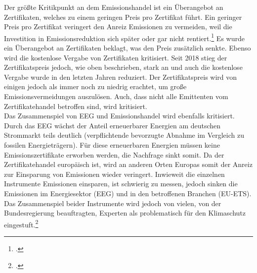 Der größte Kritikpunkt an dem Emissionshandel ist ein Überangebot an Zertifikaten, welches zu einem geringen Preis pro Zertifikat führt.
Ein geringer Preis pro Zertifikat veringert den Anreiz Emissionen zu vermeiden, weil die Investition in Emissionsreduktion sich später oder gar nicht rentiert.\footcite[Vgl. auch im Folgenden][]{Matthes2017}
Es wurde ein Überangebot an Zertifikaten beklagt, was den Preis zusätzlich senkte.
Ebenso wird die kostenlose Vergabe von Zertifikaten kritisiert.
Seit 2018 stieg der Zertifikatspreis jedoch, wie oben beschrieben, stark an und auch die kostenlose Vergabe wurde in den letzten Jahren reduziert.
Der Zertifikatspreis wird von einigen jedoch als immer noch zu niedrig erachtet, um große Emissionsvermeidungen auszulösen.
Auch, dass nicht alle Emittenten vom Zertifikatehandel betroffen sind, wird kritisiert.\\
Das Zusammenspiel von EEG und Emissionshandel wird ebenfalls kritisiert.
Durch das EEG wächst der Anteil erneuerbarer Energien am deutschen Strommarkt teils deutlich (verpflichtende bevorzugte Abnahme im Vergleich zu fossilen Energieträgern).
Für diese erneuerbaren Energien müssen keine Emissionszertifikate erworben werden, die Nachfrage sinkt somit.
Da der Zertifikatehandel europäisch ist, wird an anderen Orten Europas somit der Anreiz zur Einsparung von Emissionen wieder veringert.
Inwieweit die einzelnen Instrumente Emissionen einsparen, ist schwierig zu messen, jedoch sinken die Emissionen im Energiesektor (EEG) und in den betroffenen Branchen (EU-ETS). Das Zusammenspiel beider Instrumente wird jedoch von vielen, von der Bundesregierung beauftragten, Experten als problematisch für den Klimaschutz eingestuft.\footcite[Vgl. u.a.][]{SachverstandigenratzurBegutachtungdergesamtwirtschaftlichenEntwicklung}
